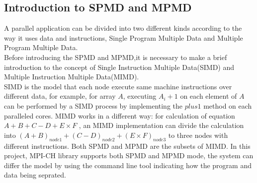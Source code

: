 \documentclass[11pt,openright,a4paper]{report}
\begin{document}
\subsection{Introduction to SPMD and MPMD}
A parallel application can be divided into two different kinds according to the way it uses data and instructions, Single Program Multiple Data and Multiple Program Multiple Data.\\
Before introducing the SPMD and MPMD,it is necessary to make a brief introduction to the concept of Single Instruction Multiple Data(SIMD) and Multiple Instruction Multiple Data(MIMD).\\
SIMD is the model that each node execute same machine instructions over different data, for example, for array ${A}$, executing $A_{i}+1$ on each element of ${A}$ can be performed by a SIMD process by implementing the ${plus 1}$ method on each paralleled cores. MIMD works in a different way: for calculation of equation $A+B+C-D+E\times F$ , an MIMD implementation can divide the calculation into $(A+B)_{node1}+(C-D)_{node2}+(E\times F)_{node3}$ to three nodes with different instructions.
Both SPMD and MPMD are the subsets of MIMD\cite{darema2001spmd}. In this project, MPI-CH library supports both SPMD and MPMD mode, the system can differ the model by using the command line tool indicating how the program and data being seprated.\\
\end{document}
